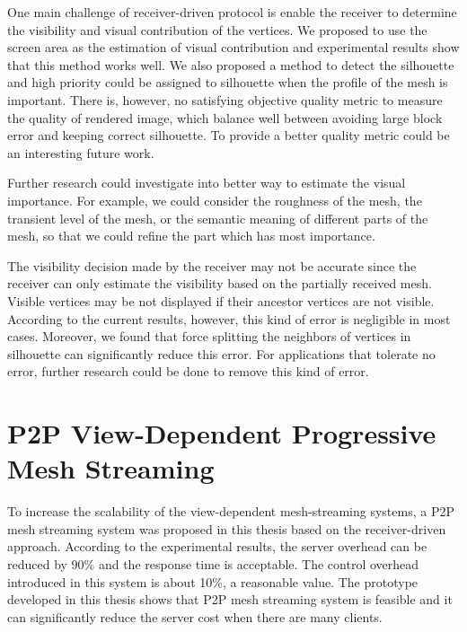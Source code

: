 One main challenge of receiver-driven protocol is enable the receiver
to determine the visibility and visual contribution of the vertices.
We proposed to use the screen area as the estimation of visual contribution and 
experimental results show that this method works well. 
We also proposed a method
to detect the silhouette and high priority could be assigned to silhouette when the
profile of the mesh is important. 
There is, however, no satisfying objective quality metric to measure the quality
of rendered image, which balance well between avoiding large block error and 
keeping correct silhouette. To provide a better quality metric could be an interesting 
future work. 

Further research could investigate into better way to estimate the visual importance.
For example, we could consider the roughness of the mesh, the transient level of the mesh,
or the semantic meaning of different parts of the mesh, so that we could refine 
the part which has most importance.

The visibility decision made by the receiver may not be accurate 
since the receiver can only estimate the visibility based on
the partially received mesh. 
Visible vertices may be not displayed if their ancestor vertices are not visible. 
According to the current results, however, this kind of error is negligible in most cases. 
Moreover, we found that force splitting the neighbors of vertices in silhouette can significantly reduce this error.
For applications that tolerate no error, 
further research could be done to remove this kind of error. 

\section{P2P View-Dependent Progressive Mesh Streaming}
To increase the scalability of the view-dependent mesh-streaming systems, 
a P2P mesh streaming system was proposed in this thesis based on the receiver-driven approach. 
According to the experimental results, the server overhead can be reduced by 90\%
and the response time is acceptable. %
The control overhead introduced in this system is about 10\%, a reasonable value. 
The prototype developed in this thesis shows that P2P mesh streaming system is feasible
and it can significantly reduce the server cost when there are many clients.

